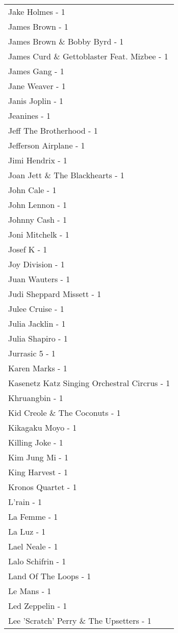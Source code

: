 \documentclass[
]{article}
\begin{document}
\begin{longtable}{l}
Jake Holmes - 1 \\ 
James Brown - 1 \\ 
James Brown \& Bobby Byrd - 1 \\ 
James Curd \& Gettoblaster Feat. Mizbee - 1 \\ 
James Gang - 1 \\ 
Jane Weaver - 1 \\ 
Janis Joplin - 1 \\ 
Jeanines - 1 \\ 
Jeff The Brotherhood - 1 \\ 
Jefferson Airplane - 1 \\ 
Jimi Hendrix - 1 \\ 
Joan Jett \& The Blackhearts - 1 \\ 
John Cale - 1 \\ 
John Lennon - 1 \\ 
Johnny Cash - 1 \\ 
Joni Mitchelk - 1 \\ 
Josef K - 1 \\ 
Joy Division - 1 \\ 
Juan Wauters - 1 \\ 
Judi Sheppard Missett - 1 \\ 
Julee Cruise - 1 \\ 
Julia Jacklin - 1 \\ 
Julia Shapiro - 1 \\ 
Jurrasic 5 - 1 \\ 
Karen Marks - 1 \\ 
Kasenetz Katz Singing Orchestral Circrus - 1 \\ 
Khruangbin - 1 \\ 
Kid Creole \& The Coconuts - 1 \\ 
Kikagaku Moyo - 1 \\ 
Killing Joke - 1 \\ 
Kim Jung Mi - 1 \\ 
King Harvest - 1 \\ 
Kronos Quartet - 1 \\ 
L'rain - 1 \\ 
La Femme - 1 \\ 
La Luz - 1 \\ 
Lael Neale - 1 \\ 
Lalo Schifrin - 1 \\ 
Land Of The Loops - 1 \\ 
Le Mans - 1 \\ 
Led Zeppelin - 1 \\ 
Lee 'Scratch' Perry \& The Upsetters - 1 \\ 

\end{longtable}
\end{document}

